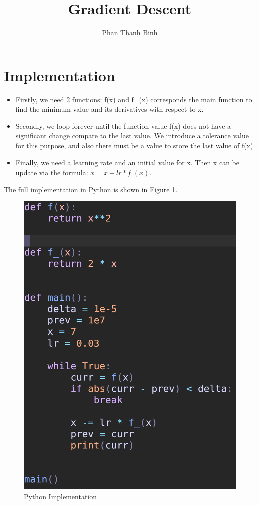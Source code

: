 \documentclass{article}
\title{Gradient Descent}
\author{Phan Thanh Binh}
\begin{document}
\maketitle

\section{Implementation}
\begin{itemize}
\item Firstly, we need 2 functions: f(x) and f\_(x) corresponds the main function to find the minimum value and its derivatives with respect to x.
\item Secondly, we loop forever until the function value f(x) does not have a significant change compare to the last value. We introduce a tolerance value for this purpose, and also there must be a value to store the last value of f(x).
\item Finally, we need a learning rate and an initial value for x. Then x can be update via the formula: $x = x - lr * f\_(x)$.
\end{itemize}
The full implementation in Python is shown in Figure \ref{fig:impl}.
\begin{figure}[H]
    \centering
    \includegraphics[width=0.5\linewidth]{impl.png}
    \caption{Python Implementation}
    \label{fig:impl}
\end{figure}
\end{document}
